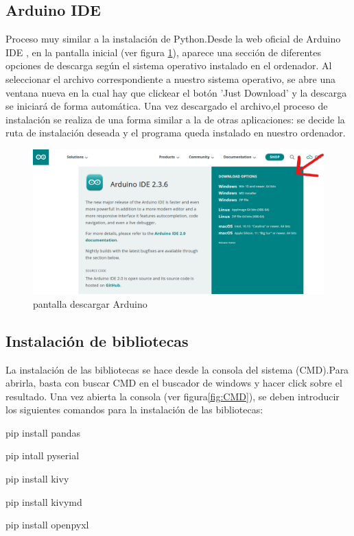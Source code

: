 \subsection{Arduino IDE}
Proceso muy similar a la instalación de Python.Desde la web oficial de Arduino IDE \cite{Arduino}, en la pantalla inicial (ver figura \ref{fig:Arduino}), aparece una sección de diferentes opciones de descarga según el sistema operativo instalado en el ordenador. Al seleccionar el archivo correspondiente a nuestro sistema operativo, se abre una ventana nueva en la cual hay que clickear el botón 'Just Download' y la descarga se iniciará de forma  automática. Una vez descargado el archivo,el proceso de instalación se realiza de una forma similar a la de otras aplicaciones: se decide la ruta de instalación deseada y el programa queda instalado en nuestro ordenador.
    \begin{figure}[h]
        \centering
        \includegraphics[width=1\textwidth]{img/pantalla inicio arduino IDE.png}
        \caption{pantalla descargar Arduino}
        \label{fig:Arduino}
    \end{figure}
\subsection{Instalación de bibliotecas}
La instalación de las bibliotecas se hace desde la consola del sistema (CMD).Para abrirla, basta con buscar CMD en el buscador de windows y hacer click sobre el resultado.
Una vez abierta la consola (ver figura\ref{fig:CMD}), se deben introducir los siguientes comandos para la instalación de las bibliotecas:

pip install pandas

pip intall pyserial

pip install kivy 

pip install kivymd

pip install openpyxl


